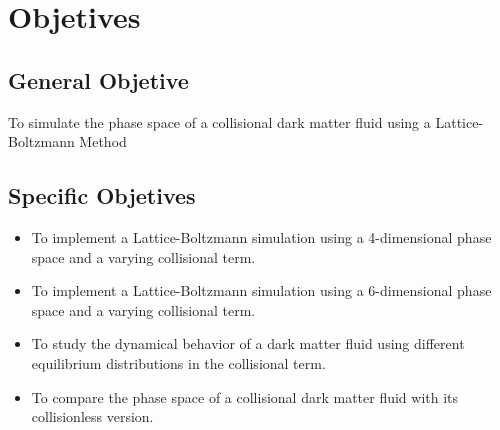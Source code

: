 \chapter{Objetives}
\section{General Objetive}
To simulate the phase space of a collisional dark matter fluid using a Lattice-Boltzmann Method
\section{Specific Objetives}
\begin{itemize}
\item To implement a Lattice-Boltzmann simulation using a 4-dimensional phase space and a varying collisional term.
\item To implement a Lattice-Boltzmann simulation using a 6-dimensional phase space and a varying collisional term.
\item To study the dynamical behavior of a dark matter fluid using different equilibrium distributions in the collisional term.
\item To compare the phase space of a collisional dark matter fluid with its collisionless version.
\end{itemize}
